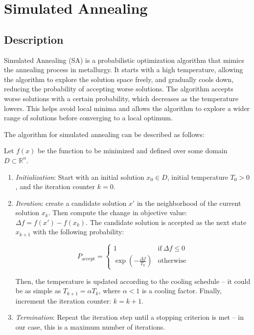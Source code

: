 \documentclass{article}
\begin{document}
\section{Simulated Annealing}

\subsection{Description}

Simulated Annealing (SA) is a probabilistic optimization algorithm
that mimics the annealing process in metallurgy. It starts with a
high temperature, allowing the algorithm to explore the solution space
freely, and gradually cools down, reducing the probability of accepting
worse solutions. The algorithm accepts worse solutions with a certain
probability, which decreases as the temperature lowers. This helps
avoid local minima and allows the algorithm to explore a wider range of
solutions before converging to a local optimum.

The algorithm for simulated annealing can be described as follows:

Let $f(x)$ be the function to be minimized and defined over some domain
$D \subset \mathbb{R}^n$.

\begin{enumerate}
  \item \textit{Initialization}: Start with an initial solution $x_0
    \in D$, initial temperature $T_0 > 0$, and the iteration counter $k = 0$.
  \item \textit{Iteration}: create a candidate solution $x'$ in the
    neighborhood of the current solution $x_k$. Then compute the
    change in objective value: $\Delta f = f(x') - f(x_k)$. The
    candidate solution is accepted as the next state $x_{k+1}$ with
    the following probability:

    $$ P_{\text{accept}} =
    \begin{cases} 1 & \text{if} \ \Delta f\leq 0\\ \exp\left(
      -\frac{\Delta f}{T_{k}}\right) & \text{otherwise}
    \end{cases} $$

    Then, the temperature is updated according to the cooling
    schedule -- it could be as simple as $T_{k+1} = \alpha T_k$,
    where $\alpha < 1$ is a cooling factor. Finally, increment the
    iteration counter: $k = k + 1$.
  \item \textit{Termination}: Repeat the iteration step until a
    stopping criterion is met -- in our case, this is a maximum
    number of iterations.
\end{enumerate}
\end{document}
